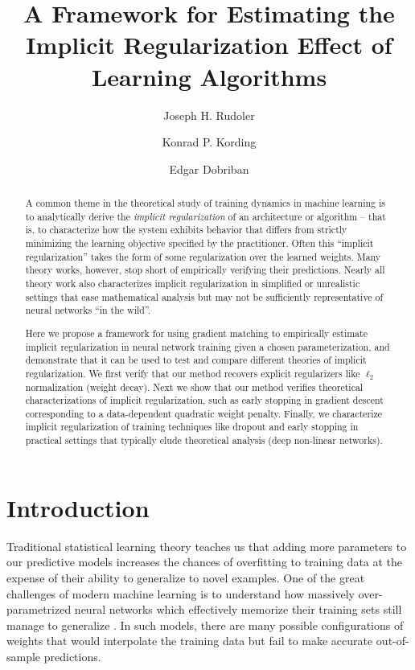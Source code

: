 \documentclass[10pt]{article}
\title{A Framework for Estimating the Implicit Regularization Effect of Learning Algorithms}
\author[1]{Joseph H. Rudoler}
\author[2]{Konrad P. Kording}
\author[1]{Edgar Dobriban}
\affil[1]{Department of Statistics and Data Science, The Wharton School}
\affil[2]{Department of Bioengineering, University of Pennsylvania}
\begin{document}
\maketitle

\begin{abstract}
    A common theme in the theoretical study of training dynamics in machine learning is to analytically derive the \emph{implicit regularization} %
    of an architecture or algorithm -- that is, to characterize how the system exhibits behavior that differs from strictly minimizing the learning objective specified by the practitioner. Often this ``implicit regularization'' takes the form of some regularization over the learned weights. Many theory works, however, stop short of empirically verifying their predictions. Nearly all theory work also characterizes implicit regularization in simplified or unrealistic settings that ease mathematical analysis but may not be sufficiently representative of neural networks ``in the wild''. 
    
    Here we propose a framework for using gradient matching to empirically estimate implicit regularization in neural network training given a chosen parameterization, and demonstrate that it can be used to test and compare different theories of implicit regularization. We first verify that our method recovers explicit regularizers like $\ell_2$ normalization (weight decay). Next we show that our method verifies theoretical characterizations of implicit regularization, such as early stopping in gradient descent corresponding to a data-dependent quadratic weight penalty. Finally, we characterize implicit regularization of training techniques like dropout and early stopping in practical settings that typically elude theoretical analysis (deep non-linear networks).  
\end{abstract}


\section{Introduction}

Traditional statistical learning theory teaches us that adding more parameters to our predictive models increases the chances of overfitting to training data at the expense of their ability to generalize to novel examples. One of the great challenges of modern machine learning is to understand how massively over-parametrized neural networks which effectively memorize their training sets still manage to generalize \citep{zhang_understanding_2021, power_grokking_2022, alexander_neural_2025}. In such models, there are many possible configurations of weights that would interpolate the training data but fail to make accurate out-of-sample predictions. 
\end{document}
